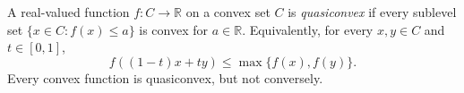 
A real-valued function $f:C\to\mathbb R$ on a convex set $C$ is \emph{quasiconvex} if every sublevel set $\{x\in C:f(x)\le a\}$ is convex for $a\in\mathbb R$. Equivalently, for every $x,y\in C$ and $t\in[0,1]$,
\[
f((1-t)x+ty)\le\max\{f(x),f(y)\}.
\]
Every convex function is quasiconvex, but not conversely.
